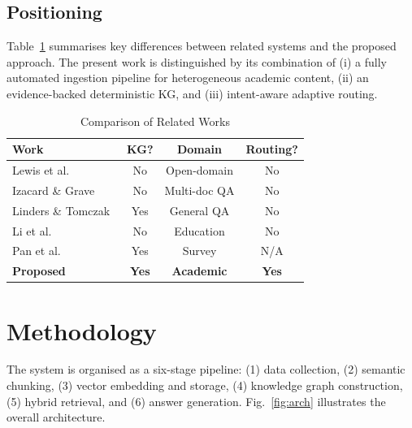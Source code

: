 \documentclass{ieeeaccess}
\begin{document}
\subsection{Positioning}
Table~\ref{tab:related} summarises key differences between related systems and the proposed approach. The present work is distinguished by its combination of (i) a fully automated ingestion pipeline for heterogeneous academic content, (ii) an evidence-backed deterministic KG, and (iii) intent-aware adaptive routing.

\begin{table}[H]
\centering
\begin{tabular}{lccc}
\toprule
\textbf{Work} & \textbf{KG?} & \textbf{Domain} & \textbf{Routing?} \\
\midrule
Lewis et al.~\cite{b3}       & No  & Open-domain & No  \\
Izacard \& Grave~\cite{b4}   & No  & Multi-doc QA & No  \\
Linders \& Tomczak~\cite{b1} & Yes & General QA   & No  \\
Li et al.~\cite{b2}          & No  & Education    & No  \\
Pan et al.~\cite{b6}         & Yes & Survey       & N/A \\
\textbf{Proposed}            & \textbf{Yes} & \textbf{Academic} & \textbf{Yes} \\
\bottomrule
\end{tabular}
\caption{Comparison of Related Works}
\label{tab:related}
\end{table}

\section{Methodology}
\label{sec:methodology}

The system is organised as a six-stage pipeline: (1) data collection, (2) semantic chunking, (3) vector embedding and storage, (4) knowledge graph construction, (5) hybrid retrieval, and (6) answer generation. Fig.~\ref{fig:arch} illustrates the overall architecture.

\end{document}
